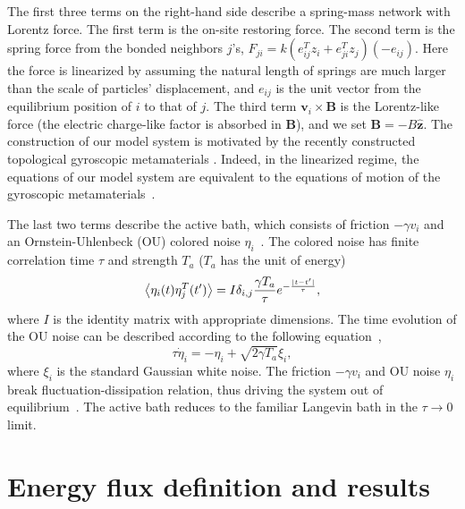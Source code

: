 \documentclass[
 preprint,
 preprintnumbers,
 amsmath,amssymb,
 aps,
 pre,
 longbibliography,
 superscriptaddress,
 10pt, twocolumn
]{revtex4-1}
\begin{document}
The first three terms on the right-hand side describe a spring-mass network with Lorentz force.
The first term is the on-site restoring force.
The second term is the spring force from the bonded neighbors $j$'s,
$F_{ji} = k (e_{ij}^T z_i + e_{ji}^T z_j) (-e_{ij})$.
Here the force is linearized by assuming the natural length of springs are much larger than the scale of particles' displacement, and $e_{ij}$ is the unit vector from the equilibrium position of $i$ to that of $j$.
The third term $\bm{v}_i\times\bm{B}$ is the Lorentz-like force (the electric charge-like factor is absorbed in $\bm{B}$), and we set $\bm{B} = -B\mathbf{\hat{z}}$.
The construction of our model system is motivated by the recently constructed topological gyroscopic metamaterials \cite{Nash2015TopologicalMechanics}. Indeed, in the linearized regime, the equations of our model system are equivalent to the equations of motion of the gyroscopic metamaterials~\cite{Lee2018TopologicalDynamics}.

The last two terms describe the active bath, which consists of friction $-\gamma v_i$ and an Ornstein-Uhlenbeck (OU) colored noise $\eta_i$~\cite{Fodor2016HowFar}.
The colored noise has finite correlation time $\tau$ and strength $T_a$ ($T_a$ has the unit of energy)
\begin{equation} \label{eqn:noise_correlation}
    \expval{\eta_i(t)\eta_{j}^T(t')} = I\delta_{i,j}\frac{\gamma T_a}{\tau} e^{-\frac{|t-t'|}{\tau}} ,
\end{equation}
where $I$ is the identity matrix with appropriate dimensions.
The time evolution of the OU noise can be described according to the following equation~\cite{Hanggi1994ColoredNoise},
\begin{equation} \label{eqn:noise_eom}
    \tau \dot{\eta}_i = -\eta_i + \sqrt{2\gamma T_a}\xi_i ,
\end{equation}
where $\xi_i$ is the standard Gaussian white noise.
The friction $-\gamma v_i$ and OU noise $\eta_i$ break fluctuation-dissipation relation, thus driving the system out of equilibrium~\cite{Fodor2016HowFar}.
The active bath reduces to the familiar Langevin bath in the $\tau \rightarrow 0$ limit.


\section{Energy flux definition and results} \label{sec:flux}
\end{document}
